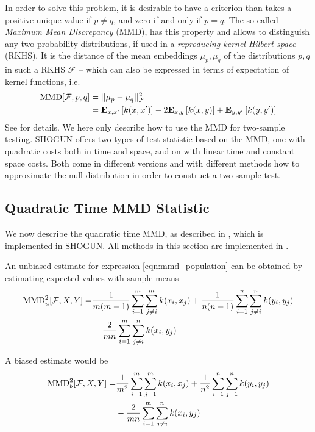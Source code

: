 In order to solve this problem, it is desirable to have a criterion than takes a positive unique value if $p\neq q$, and zero if and only if $p=q$. The so called \emph{Maximum Mean Discrepancy} (MMD), has this property and allows to distinguish any two probability distributions, if used in a \emph{reproducing kernel Hilbert space} (RKHS). It is the distance of the mean embeddings $\mu_p, \mu_q$ of the distributions $p,q$ in such a RKHS $\mathcal{F}$ -- which can also be expressed in terms of expectation of kernel functions, i.e.
\begin{align}
\label{eqn:mmd_population}
\operatorname{MMD}[\mathcal{F},p,q]&=||\mu_p-\mu_q||_\mathcal{F}^2\\
&=\textbf{E}_{x,x'}\left[ k(x,x')\right]-
  2\textbf{E}_{x,y}\left[ k(x,y)\right]
  +\textbf{E}_{y,y'}\left[ k(y,y')\right]\notag
\end{align}
See \citep[Section 2]{Gretton2012} for details. We here only describe how to use the MMD for two-sample testing. SHOGUN offers two types of test statistic based on the MMD, one with quadratic costs both in time and space, and on with linear time and constant space costs. Both come in different versions and with different methods how to approximate the null-distribution in order to construct a two-sample test.

\subsection{Quadratic Time MMD Statistic}
\label{sec:mmd_quadratic}
We now describe the quadratic time MMD, as described in \citep[Lemma 6]{Gretton2012}, which is implemented in SHOGUN. All methods in this section are implemented in .

An unbiased estimate for expression \ref{eqn:mmd_population} can be obtained by estimating expected values with sample means
\begin{align*}
\operatorname{MMD}_u^2[\mathcal{F},X,Y]=&\frac{1}{m(m-1)}\sum_{i=1}^m\sum_{j\neq i}^mk(x_i,x_j) + \frac{1}{n(n-1)}\sum_{i=1}^n\sum_{j\neq i}^nk(y_i,y_j)\\
&-\frac{2}{mn}\sum_{i=1}^m\sum_{j\neq i}^nk(x_i,y_j)
\end{align*}

A biased estimate would be
\begin{align*}
\operatorname{MMD}_b^2[\mathcal{F},X,Y]=&\frac{1}{m^2}\sum_{i=1}^m\sum_{j=1}^mk(x_i,x_j) + \frac{1}{n^ 2}\sum_{i=1}^n\sum_{j=1}^nk(y_i,y_j)\\
&-\frac{2}{mn}\sum_{i=1}^m\sum_{j\neq i}^nk(x_i,y_j)
\end{align*}

